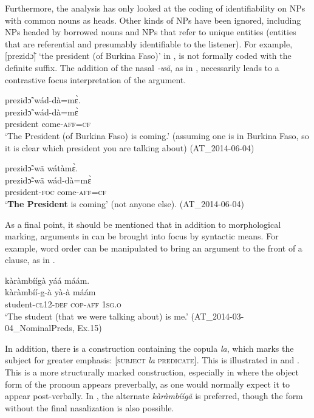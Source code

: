\documentclass[output=paper]{langsci/langscibook}
\begin{document}
Furthermore, the analysis has only looked at the coding of identifiability on NPs with common nouns as heads. Other kinds of NPs have been ignored, including NPs headed by borrowed nouns and NPs that refer to unique entities (entities that are referential and presumably identifiable to the listener). For example, [prezid\~{ɔ}] ‘the president (of Burkina Faso)’ in , is not formally coded with the definite suffix. The addition of the nasal \textit{-wã}, as in , necessarily leads to a contrastive focus interpretation of the argument.

\ea\label{ex:teo:60}
\glll prezid\~{ɔ} wád-dà=m\`ɛ. \\
prezid\~{ɔ} wád-dà=m\`ɛ \\
president come\textsc{-aff=cf}\\
\glt ‘The President (of Burkina Faso) is coming.’ (assuming one is in Burkina Faso, so it is clear which president you are talking about) (AT\_2014-06-04)
\z

\ea\label{ex:teo:61}
\glll prezid\~{ɔ}-wã wátàm\`ɛ.\\
prezid\~{ɔ}-wã wád-dà=m\`ɛ\\
president-\textsc{foc} come\textsc{-aff=cf}\\
\glt ‘\textbf{The President} is coming’ (not anyone else). (AT\_2014-06-04)
\z

As a final point, it should be mentioned that in addition to morphological marking, arguments in  can be brought into focus by syntactic means. For example, word order can be manipulated to bring an argument to the front of a clause, as in .

\ea\label{ex:teo:62}
\glll kàràmbíígà yáá máám.\\
kàràmbíí-g-à yà-à máám\\
student-\textsc{cl12-def} \textsc{cop-aff} \textsc{1sg.o}\\
\glt ‘The student (that we were talking about) is me.’ (AT\_2014-03-04\_NominalPreds, Ex.15)
\z

In addition, there is a construction containing the copula \textit{la}, which marks the subject for greater emphasis: [\textsc{subject} \textit{la} \textsc{predicate}]. This is illustrated in  and . This is a more structurally marked construction, especially in  where the object form of the pronoun appears preverbally, as one would normally expect it to appear post-verbally. In , the alternate \textit{kàràmbíígã} is preferred, though the form without the final nasalization is also possible. 
\end{document}
